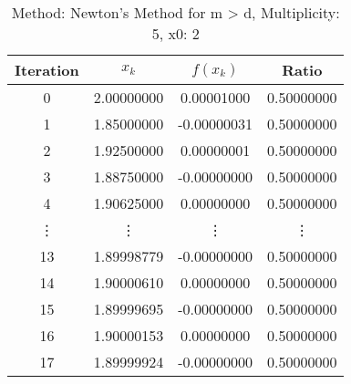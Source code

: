 \begin{table}
\centering
\caption{Method: Newton's Method for m > d, Multiplicity: 5, x0: 2}
\label{tab:table_Newton's_Method_for_m_>_d_5_2}
\begin{tabular}{c c c c}
\toprule
Iteration &      $x_k$ &    $f(x_k)$ &      Ratio \\
\midrule
        0 & 2.00000000 &  0.00001000 & 0.50000000 \\
        1 & 1.85000000 & -0.00000031 & 0.50000000 \\
        2 & 1.92500000 &  0.00000001 & 0.50000000 \\
        3 & 1.88750000 & -0.00000000 & 0.50000000 \\
        4 & 1.90625000 &  0.00000000 & 0.50000000 \\
   \vdots &     \vdots &      \vdots &     \vdots \\
       13 & 1.89998779 & -0.00000000 & 0.50000000 \\
       14 & 1.90000610 &  0.00000000 & 0.50000000 \\
       15 & 1.89999695 & -0.00000000 & 0.50000000 \\
       16 & 1.90000153 &  0.00000000 & 0.50000000 \\
       17 & 1.89999924 & -0.00000000 & 0.50000000 \\
\bottomrule
\end{tabular}
\end{table}
